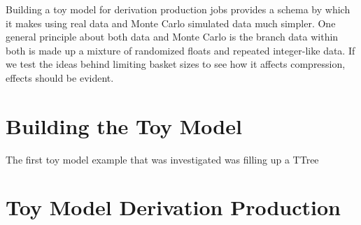 Building a toy model for derivation production jobs provides a schema by which it makes using real data and Monte Carlo simulated data much simpler.
One general principle about both data and Monte Carlo is the branch data within both is made up a mixture of randomized floats and repeated integer-like data. 
If we test the ideas behind limiting basket sizes to see how it affects compression, effects should be evident. 

\section{Building the Toy Model}

The first toy model example that was investigated was filling up a TTree

\section{Toy Model Derivation Production}